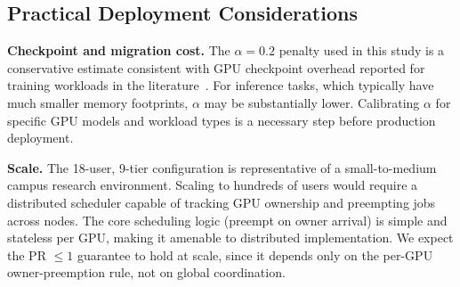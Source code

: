 
\subsection{Practical Deployment Considerations}
\label{sec:discussion_practical}


\textbf{Checkpoint and migration cost.}
The $\alpha = 0.2$ penalty used in this study is a conservative estimate
consistent with GPU checkpoint overhead reported for training workloads
in the literature~\cite{xiao2020antman,han2023chimera}.
For inference tasks, which typically have much smaller memory footprints,
$\alpha$ may be substantially lower.
Calibrating $\alpha$ for specific GPU models and workload types is
a necessary step before production deployment.


\textbf{Scale.}
The 18-user, 9-tier configuration is representative of a small-to-medium
campus research environment.
Scaling to hundreds of users would require a distributed scheduler
capable of tracking GPU ownership and preempting jobs across nodes.
The core scheduling logic (preempt on owner arrival) is simple and
stateless per GPU, making it amenable to distributed implementation.
We expect the PR $\leq 1$ guarantee to hold at scale,
since it depends only on the per-GPU owner-preemption rule,
not on global coordination.

